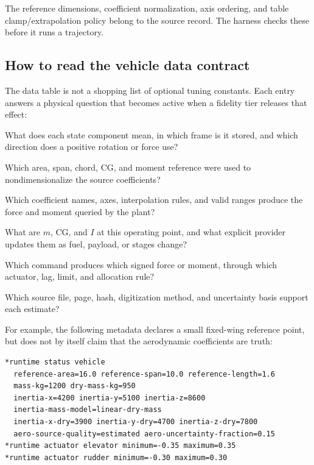 \documentclass[11pt]{article}
\begin{document}
The reference dimensions, coefficient normalization, axis ordering, and table
clamp/extrapolation policy belong to the source record. The harness checks these
before it runs a trajectory.

\subsection{How to read the vehicle data contract}

The data table is not a shopping list of optional tuning constants. Each entry
answers a physical question that becomes active when a fidelity tier releases
that effect:

\begin{description}[leftmargin=1.55in,labelwidth=1.35in,style=sameline]
  \item[State and frames] What does each state component mean, in which frame
    is it stored, and which direction does a positive rotation or force use?
  \item[Reference geometry] Which area, span, chord, CG, and moment reference
    were used to nondimensionalize the source coefficients?
  \item[Aerodynamic model] Which coefficient names, axes, interpolation rules,
    and valid ranges produce the force and moment queried by the plant?
  \item[Mass properties] What are $m$, CG, and $I$ at this operating point, and
    what explicit provider updates them as fuel, payload, or stages change?
  \item[Effectors] Which command produces which signed force or moment, through
    which actuator, lag, limit, and allocation rule?
  \item[Provenance] Which source file, page, hash, digitization method, and
    uncertainty basis support each estimate?
\end{description}

For example, the following metadata declares a small fixed-wing reference
point, but does not by itself claim that the aerodynamic coefficients are
truth:

\begin{lstlisting}
*runtime status vehicle
  reference-area=16.0 reference-span=10.0 reference-length=1.6
  mass-kg=1200 dry-mass-kg=950
  inertia-x=4200 inertia-y=5100 inertia-z=8600
  inertia-mass-model=linear-dry-mass
  inertia-x-dry=3900 inertia-y-dry=4700 inertia-z-dry=7800
  aero-source-quality=estimated aero-uncertainty-fraction=0.15
*runtime actuator elevator minimum=-0.35 maximum=0.35
*runtime actuator rudder minimum=-0.30 maximum=0.30
\end{lstlisting}
\end{document}
